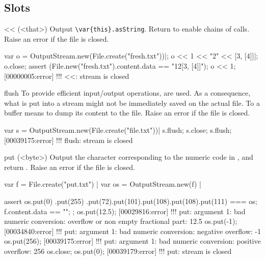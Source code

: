 \subsection{Slots}

\begin{urbiscriptapi}
\item[<<](<that>)%
  Output \lstinline|\var{this}.asString|.  Return \this to
  enable chains of calls.  Raise an error if the file is closed.
\begin{urbiscript}
var o = OutputStream.new(File.create("fresh.txt"))|;
o << 1 << "2" << [3, [4]]|;
o.close;
assert (File.new("fresh.txt").content.data == "12[3, [4]]");
o << 1;
[00000005:error] !!! <<: stream is closed
\end{urbiscript}

\item[flush]%
  To provide efficient input/output operations,  are
  used.  As a consequence, what is put into a stream might not be
  immediately saved on the actual file.  To  a buffer means to
  dump its content to the file.  Raise an error if the file is closed.
\begin{urbiscript}
var s = OutputStream.new(File.create("file.txt"))|
s.flush;
s.close;
s.flush;
[00039175:error] !!! flush: stream is closed
\end{urbiscript}

\item[put](<byte>)%
  Output the character corresponding to the numeric code  in
  \this, and return \this.  Raise an error if the file is closed.
\begin{urbiscript}
var f = File.create("put.txt") |
var os = OutputStream.new(f) |

assert
{
  os.put(0)
    .put(255)
    .put(72).put(101).put(108).put(108).put(111)
  === os;
  f.content.data == "\0\xffHello";
};
os.put(12.5);
[00029816:error] !!! put: argument 1: bad numeric conversion: overflow or non empty fractional part: 12.5
os.put(-1);
[00034840:error] !!! put: argument 1: bad numeric conversion: negative overflow: -1
os.put(256);
[00039175:error] !!! put: argument 1: bad numeric conversion: positive overflow: 256
os.close;
os.put(0);
[00039179:error] !!! put: stream is closed
\end{urbiscript}

\end{urbiscriptapi}



